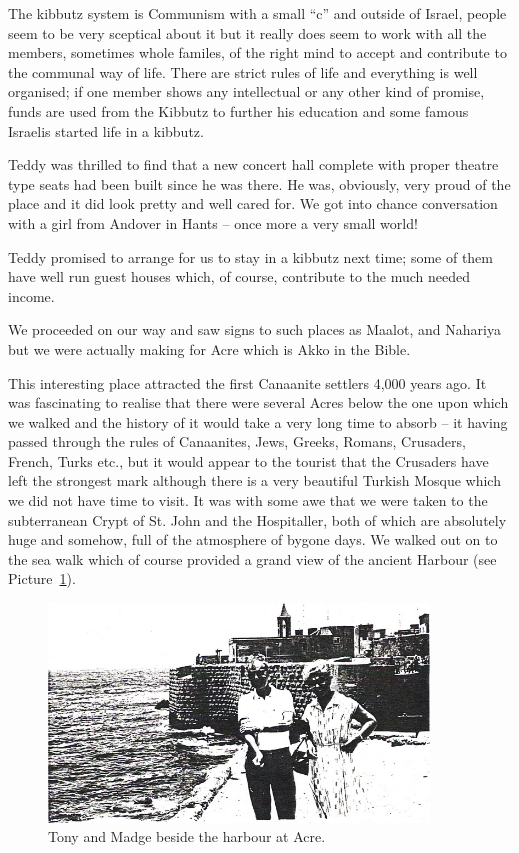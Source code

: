 The kibbutz system is Communism with a small ``c'' and outside of
Israel, people seem to be very sceptical about it but it really does
seem to work with all the members, sometimes whole familes, of the
right mind to accept and contribute to the communal way of life. There
are strict rules of life and everything is well organised; if one
member shows any intellectual or any other kind of promise, funds are
used from the Kibbutz to further his education and some famous
Israelis started life in a kibbutz.

Teddy was thrilled to find that a new concert hall complete with
proper theatre type seats had been built since he was there. He was,
obviously, very proud of the place and it did look pretty and well
cared for. We got into chance conversation with a girl from Andover in
Hants -- once more a very small world!

Teddy promised to arrange for us to stay in a kibbutz next time; some
of them have well run guest houses which, of course, contribute to the
much needed income.

We proceeded on our way and saw signs to such places as Maalot, and
Nahariya but we were actually making for Acre which is Akko in the
Bible.

This interesting place attracted the first Canaanite settlers 4,000
years ago. It was fascinating to realise that there were several Acres
below the one upon which we walked and the history of it would take a
very long time to absorb -- it having passed through the rules of
Canaanites, Jews, Greeks, Romans, Crusaders, French, Turks etc., but
it would appear to the tourist that the Crusaders have left the
strongest mark although there is a very beautiful Turkish Mosque which
we did not have time to visit. It was with some awe that we were taken
to the subterranean Crypt of St. John and the Hospitaller, both of
which are absolutely huge and somehow, full of the atmosphere of
bygone days. We walked out on to the sea walk which of course provided
a grand view of the ancient Harbour (see Picture~\ref{israel4}).

\begin{figure}
  \centering
  \includegraphics[width=0.9\textwidth]{photos/israel4}
  \caption{Tony and Madge beside the harbour at Acre.}
  \label{israel4}
\end{figure}


